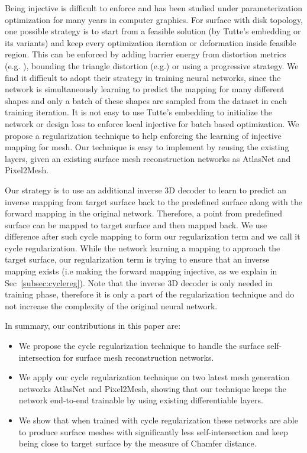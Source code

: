 Being injective is difficult to enforce and has been studied under parameterization optimization for many years in computer graphics. For surface with disk topology, one possible strategy is to start from a feasible solution (by Tutte's embedding\cite{tutte} or its variants) and keep every optimization iteration or deformation inside feasible region. This can be enforced by adding barrier energy from distortion metrics (e.g. \cite{provableplanarmapping,lifted_bijection}), bounding the triangle distortion (e.g.\cite{freeboundary,boundeddistortion})
or using a progressive strategy\cite{Liu_PP_2018}.
We find it difficult to adopt their strategy in training neural networks, since the network is simultaneously learning to predict the mapping for many different shapes and only a batch of these shapes are sampled from the dataset in each training iteration. It is not easy to use Tutte's embedding to initialize the network or design loss to enforce local injective for batch based optimization. We propose a regularization technique to help enforcing the learning of injective mapping for mesh. Our technique is easy to implement by reusing the existing layers, given an existing surface mesh reconstruction networks as AtlasNet\cite{atlasnet} and Pixel2Mesh\cite{pixel2mesh}.

 Our strategy is to use an additional inverse 3D decoder to learn to predict an inverse mapping from target surface back to the predefined surface along with the forward mapping in the original network. Therefore, a point from predefined surface can be mapped to target surface and then mapped back. We use difference after such cycle mapping to form our regularization term and we call it cycle regularization. While the network learning a mapping to approach the target surface, our regularization term is trying to ensure that an inverse mapping exists (i.e making the forward mapping injective, as we explain in Sec~\ref{subsec:cyclereg}).
Note that the inverse 3D decoder is only needed in training phase, therefore it is only a part of the regularization technique and do not increase the complexity of the original neural network.

In summary, our contributions in this paper are:
\begin{itemize}
	\item We propose the cycle regularization technique to handle the surface self-intersection for surface mesh reconstruction networks. 
	\item We apply our cycle regularization technique on two latest mesh generation networks AtlasNet\cite{atlasnet} and Pixel2Mesh\cite{pixel2mesh}, showing that our technique keeps the network end-to-end trainable by using existing differentiable layers.
	\item We show that when trained with cycle regularization these networks are able to produce surface meshes with significantly less self-intersection and keep being close to target surface by the measure of Chamfer distance.
\end{itemize}




 